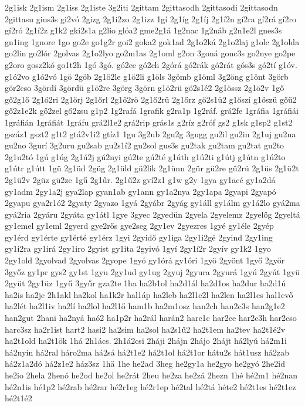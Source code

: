 {2g1isk
2g1ism
2g1iss
2g1iste
3g2iti
2gittam
2gittasodh
2gittasodi
2gittasodn
2gittasu
gius3s
gi2vó
2gizg
2g1i2zo
2g1izz
1gí
2g1íg
2g1íj
2g1í2n
gí2ra
gí2rá
gí2ro
gí2ró
2g1í2z
g1k2
gki2s1a
g2lio
glóa2
gme2g1á
1g2nac
1g2náb
g2n1e2l
gnes3s
gn1ing
1gnore
1go
go2e
go1g2r
goi2
goka2
gok1ad
2g1o2ká
2g1o2laj
g1olc
2g1olda
go2lin
go2lór
2golvas
2g1o2lyo
go2m1as
2g1oml
g2on
3goná
gonc3s
go2nye
go2pe
g2oro
gosz2kó
go1t2h
1gó
3gó.
gó2ce
gó2ch
2górá
gó2rák
gó2rát
gós3s
gó2tí
g1óv.
g1ó2vo
g1ó2vó
1gö
2göb
2g1ö2le
g1ö2li
g1öls
3gömb
g1öml
3g2öng
g1önt
3görb
gör2cso
3gördí
3gördü
g1ö2re
3görg
3görn
g1ö2rü
gö2s1é2
2g1össz
2g1ö2v
1gő
gő2g1ő
2g1ő2ri
2g1őrj
2g1őrl
2g1ő2rö
2g1ő2rü
2g1őrz
gő2s1ü2
g1őszí
g1őszü
gőü2
gő2z1e2k
gő2zel
gő2zsu
g1p2
1g2rafá
1grafik
g2ra1p
1g2ráf.
grá2fe
1gráfia
1gráfiái
1gráfián
1gráfiát
1gráfu
grá2l1e2
grá2rip
grás1s
g2ríz
g2róf
gs2
g1sk
g1sp2
g1st2
gszáz1
gszt2
g1t2
gtá2v1i2
gtíz1
1gu
3g2ub
2gu2g
3gugg
gu2il
gu2in
2g1uj
gu2na
gu2no
3gurí
3g2uru
gu2sab
gu2s1í2
gu2sol
gus3s
gu2tak
gu2tam
gu2tat
gu2to
2g1u2tó
1gú
g1úg
2g1ú2j
gú2nyi
gú2te
gú2té
g1úth
g1ú2ti
g1útj
g1útn
g1ú2to
g1útr
g1útt
1gü
2g1üd
2güg
2g1üld
gü2lik
2g1ünn
2gür
gü2re
gü2rü
2g1üs
2g1ü2t
2g1ü2v
2güz
gü2ze
1gű
2g1űr.
2g1ű2z
gví2z1
g1w
g2y
1gya
gy1acé
gy1a2dá
gy1adm
2gy1a2j
gya2lap
gyan1ab
gy1ann
gy1a2nya
2gy1apa
2gyapi
2gyapó
2gyapu
gya2r1ó2
2gyaty
2gyazo
1gyá
2gyábr
2gyág
gy1áll
gy1álm
gy1á2lo
gyá2ma
gyá2ria
2gyáru
2gyáta
gy1átl
1gye
3gyec
2gyedün
2gyela
2gyelemz
2gyelőg
2gyeltá
gy1emel
gy1eml
2gyerd
gye2rős
gye2seg
2gy1ev
2gyezres
1gyé
gy1éle
2gyép
gy1érd
gy1érte
gy1érté
gy1érz
1gyi
2gyidő
gy1iga
2gy1i2gé
2gyind
2gy1ing
gy1i2ra
gy1irá
2gy1iro
2gyist
gy1ita
2gyivó
1gyí
2gy1í2r
2gyív
gy1k2
1gyo
2gy1old
2gyolvad
2gyolvas
2gyope
1gyó
gy1órá
gy1óri
1gyö
2gyönt
1győ
2győr
3győz
gy1pr
gys2
gy1st
1gyu
2gy1ud
gy1ug
2gyuj
2gyura
2gyurá
1gyú
2gyút
1gyü
2gyüt
2gy1üz
1gyű
3gyűr
gza2te
1ha
ha2b1ol
ha2d1ál
ha2d1os
ha2dur
ha2d1ú
ha2is
ha2je
2h1akl
ha2kol
ha1k2r
hal1áp
ha2leb
ha2l1e2l
ha2len
ha2l1es
hal1evő
ha2lét
ha2l1iv
ha2lí
ha2lol
ha2l1ő
ham1b
ha2m1osz
han2ch
han2c3s
han2g1e2
han2gut
2hani
ha2nyá
haó2
ha1p2r
ha2rál
harán2
harc1c
har2ce
har2c3h
har2cso
harc3sz
ha2r1ist
hart2
hasi2
ha2sim
ha2sol
ha2s1ű2
ha2t1em
ha2tev
ha2t1é2v
ha2t1old
ha2t1ök
1há
2h1ács.
2h1á2csi
2háji
2hájn
2hájo
2hájt
há2lyú
há2m1i
há2nyin
há2ral
háro2ma
há2sá
há2t1e2
há2t1ol
há2t1or
hátu2s
hát1usz
há2zab
há2z1a2dó
há2z1e2
ház3sz
1hä
1he
he2ad
3heg
he2gy1a
he2gyo
he2gyó
2he2id
he2io
2hela
2henó
he2od
he2ol
he2rát
2heu
he2za
he2zá
2hezn
1hé
hé2m1
hé2nan
hé2n1is
hé1p2
hé2rab
hé2rar
hé2r1eg
hé2r1ep
hé2tal
hé2tá
héte2
hé2t1es
hé2t1ez
hé2t1é2
}
